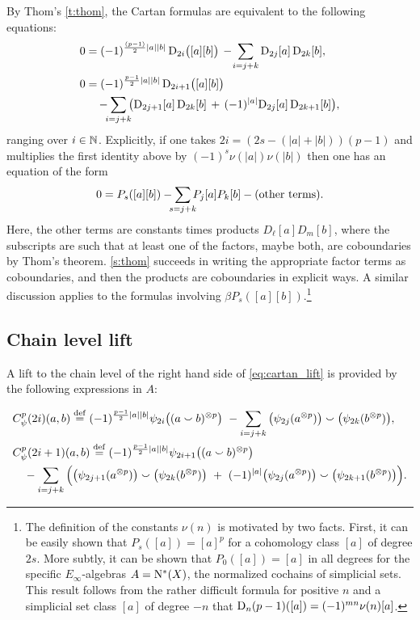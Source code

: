 By Thom's \cref{t:thom}, the Cartan formulas are equivalent to the following equations:
\begin{equation}\label{eq:cartan_lift}
	\begin{split}
		0 &= (-1)^{\frac{(p-1)}{2}\bars{a}\bars{b}} \, \rD_{2i}\big([a][b]\big) \,-\!
		\sum_{i=j+k} \rD_{2j}[a] \, \rD_{2k}[b], \\
		0 &= (-1)^{\frac{p-1}{2}\bars{a}\bars{b}} \, \rD_{2i+1}\big([a][b]\big) \\ & \quad
		-\sum_{\mathclap{i=j+k}} \big(\rD_{2j+1}[a] \, \rD_{2k}[b] \, +\, (-1)^{\bars{a}}\rD_{2j}[a] \, \rD_{2k+1}[b]\big),
	\end{split}
\end{equation}
ranging over $i \in \mathbb{N}$.
Explicitly, if one takes $2i = (2s-(|a|+|b|))(p-1)$ and multiplies the first identity above by $(-1)^s \nu(|a|)\nu(|b|)$ then one has an equation of the form
\[
0 = P_s([a][b]) - \sum_{\mathclap{s=j+k}} P_j[a] P_k[b] - \text{(other terms)}.
\]
Here, the other terms are constants times products $D_\ell[a] D_m[b]$, where the subscripts are such that at least one of the factors, maybe both, are coboundaries by Thom’s theorem.
\cref{s:thom} succeeds in writing the appropriate factor terms as coboundaries, and then the products are coboundaries in explicit ways.
A similar discussion applies to the formulas involving $\beta P_s([a][b])$.\footnote{\label{fn:mu}
The definition of the constants $\nu(n)$ is motivated by two facts.
First, it can be easily shown that $P_s([a]) = [a]^p$ for a cohomology class $[a]$ of degree $2s$.
More subtly, it can be shown that $P_0([a]) = [a]$ in all degrees for the specific $E_\infty$-algebras $A = \operatorname{N^{\ast}}(X)$, the normalized cochains of simplicial sets.
This result follows from the rather difficult formula for positive $n$ and a simplicial set class $[a]$ of degree $-n$ that $\mathrm{D}_n(p-1)([a]) = (-1)^{mn} \nu(n)[a]$.
}


\subsection{Chain level lift}

A lift to the chain level of the right hand side of \cref{eq:cartan_lift} is provided by the following expressions in $A$:

\begin{align*}
	&C_\psi^p(2i)(a,b) \defeq (-1)^{\frac{p-1}{2}\bars{a}\bars{b}} \psi_{2i}\big((a \cp b)^{\ot p}\big) \ -
	\sum_{i=j+k}\big(\psi_{2j}(a^{\ot p})\big) \cp \big(\psi_{2k}(b^{\ot p})\big), \\
	&C_\psi^p(2i+1)(a,b) \defeq (-1)^{\frac{p-1}{2}\bars{a}\bars{b}} \psi_{2i+1}\big((a \cp b)^{\ot p}\big) \\
	&\quad -\sum_{i=j+k} \Big(
	\big(\psi_{2j+1}(a^{\ot p})\big) \cp \big(\psi_{2k}(b^{\ot p})\big)\ +\
	(-1)^{\bars{a}}\big(\psi_{2j}(a^{\ot p})\big) \cp \big(\psi_{2k+1}(b^{\ot p})\big)
	\Big).
\end{align*}

